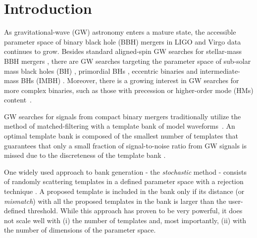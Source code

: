 \documentclass[twocolumn,showpacs,preprintnumbers,nofootinbib,prd,
superscriptaddress,10pt]{revtex4-2}
\begin{document}
\section{Introduction}

As gravitational-wave (GW) astronomy enters a mature state, the accessible parameter space of binary black hole (BBH) mergers in LIGO \cite{LIGOScientific:2014pky} and Virgo \cite{VIRGO:2014yos} data continues to grow. Besides standard aligned-spin GW searches for stellar-mass BBH mergers \cite{GWTC-1,GWTC-2,GWTC-2.1, GWTC-3}, there are GW searches targeting the parameter space of sub-solar mass black holes (BH) \cite{SSM_O2, SSM_O3a, PhysRevD.106.023024, Nitz:2021mzz}, primordial BHs \cite{PBH}, eccentric binaries \cite{PhysRevD.102.043005, PhysRevD.104.104016, Nitz:2019spj, LIGOScientific:2019dag, Ramos-Buades:2020eju, Wang:2021qsu, Nitz:2021mzz} and intermediate-mass BHs (IMBH) \cite{IMBH_O2, IMBH_O3, Chandra:2022ixv}. Moreover, there is a growing interest in GW searches for more complex binaries, such as those with precession \cite{PhysRevD.89.024010, Harry:2017weg, PhysRevD.102.041302, Indik:2016qky, Harry:2016ijz, Fairhurst:2019vut, McIsaac:2023ijd} or higher-order mode (HMs) content~\cite{CalderonBustillo:2015lrt, Harry:2017weg, Chandra_hom, 2021PhRvD.103b4042M, Wadekar:2023kym}.

GW searches for signals from compact binary mergers traditionally utilize the method of matched-filtering with a template bank of model waveforms~\cite{Sathyaprakash:1991mt, Dhurandhar:1992mw, Owen:1998dk, Allen:2005fk, Babak:2006ty, Cokelaer:2007mv}.
An optimal template bank is composed of the smallest number of templates that guarantees that only a small fraction of signal-to-noise ratio from GW signals is missed due to the discreteness of the template bank \cite{Prix:2007ks}.

One widely used approach to bank generation - the {\it stochastic} method \cite{Harry:2009ea, PhysRevD.80.104014, Ajith:2012mn} - consists of randomly scattering templates in a defined parameter space with a rejection technique \cite{DalCanton:2017ala, Mukherjee:2018yra, Indik:2016qky, Lenon:2021zac}. A proposed template is included in the bank only if its distance (or {\it mismatch}) with all the proposed templates in the bank is larger than the user-defined threshold.
While this approach has proven to be very powerful, it does not scale well with (i) the number of templates and, most importantly, (ii) with the number of dimensions of the parameter space.
\end{document}
